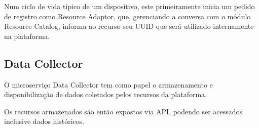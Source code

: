 Num ciclo de vida típico de um dispositivo, este primeiramente inicia um
pedido de registro como Resource Adaptor, que, gerenciando a conversa com o
módulo Resource Catalog, informa ao recurso seu UUID que será utilizado
internamente na plataforma.

\subsection{Data Collector}

O microserviço Data Collector tem como papel o armazenamento e disponibilização
de dados coletados pelos recursos da plataforma\cite{delesposte2017}.

Os recursos armazenados são então expostos via API, podendo ser acessados
inclusive dados históricos.

